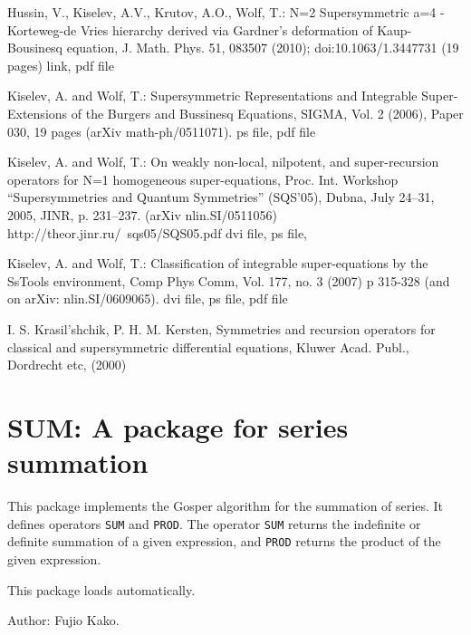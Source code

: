 \begin{cbunit}
\begin{thebibliography}{99}

Hussin, V., Kiselev, A.V., Krutov, A.O., Wolf, T.: N=2 Supersymmetric a=4 -
Korteweg-de Vries hierarchy derived via Gardner's deformation of
Kaup-Bousinesq equation, J. Math. Phys. 51, 083507 (2010);
doi:10.1063/1.3447731 (19 pages) link, pdf file

Kiselev, A. and Wolf, T.: Supersymmetric Representations and Integrable
Super-Extensions of the Burgers and Bussinesq Equations, SIGMA, Vol. 2 (2006),
Paper 030, 19 pages (arXiv math-ph/0511071). ps file, pdf file

Kiselev, A. and Wolf, T.: On weakly non-local, nilpotent, and super-recursion
operators for N=1 homogeneous super-equations, Proc. Int. Workshop
``Supersymmetries and Quantum Symmetries'' (SQS'05), Dubna, July 24--31, 2005,
JINR, p. 231--237. (arXiv nlin.SI/0511056)
http://theor.jinr.ru/~sqs05/SQS05.pdf dvi file, ps file,

Kiselev, A. and Wolf, T.: Classification of integrable super-equations by the
SsTools environment, Comp Phys Comm, Vol. 177, no. 3 (2007) p 315-328 (and on
arXiv: nlin.SI/0609065). dvi file, ps file, pdf file

I. S. Krasil'shchik, P. H. M. Kersten, Symmetries and recursion operators for
classical and supersymmetric differential equations, Kluwer Acad. Publ.,
Dordrecht etc, (2000) 

\end{thebibliography}

\end{cbunit}


\newpage

\section{SUM: A package for series summation} 
\hypertarget{operator:SUM}{}
\hypertarget{operator:PROD}{}

This package implements the Gosper algorithm for the summation of series.
It defines operators {\tt SUM} and {\tt PROD}.  The operator {\tt SUM}
returns the indefinite or definite summation of a given expression, and
{\tt PROD} returns the product of the given expression.

This package loads automatically.

Author: Fujio Kako.


